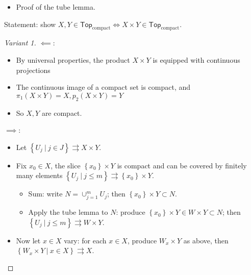 \begin{solution}

\envlist

\begin{concept}

\envlist

\begin{itemize}
\tightlist
\item
  Proof of the tube lemma.
\end{itemize}

\end{concept}

Statement: show
\(X, Y \in {\mathsf{Top}}_{\mathrm{compact}} \iff X\times Y\in {\mathsf{Top}}_{\mathrm{compact}}\).

\begin{proof}[Variant 1]

\(\impliedby\):

\begin{itemize}
\tightlist
\item
  By universal properties, the product \(X\times Y\) is equipped with
  continuous projections
\item
  The continuous image of a compact set is compact, and
  \(\pi_1(X\times Y) = X, p_2(X\times Y) = Y\)
\item
  So \(X, Y\) are compact.
\end{itemize}

\(\implies\):

\begin{itemize}
\tightlist
\item
  Let
  \(\left\{{U_j {~\mathrel{\Big|}~}j\in J}\right\} \rightrightarrows X\times Y\).
\item
  Fix \(x_0\in X\), the slice \(\left\{{x_0}\right\} \times Y\) is
  compact and can be covered by finitely many elements
  \(\left\{{U_j{~\mathrel{\Big|}~}j\leq m}\right\} \rightrightarrows\left\{{x_0}\right\} \times Y\).

  \begin{itemize}
  \tightlist
  \item
    Sum: write \(N = \cup_{j=1}^m U_j\); then
    \(\left\{{x_0}\right\} \times Y \subset N\).
  \item
    Apply the tube lemma to \(N\): produce
    \(\left\{{x_0}\right\} \times Y \in W\times Y \subset N\); then
    \(\left\{{U_j {~\mathrel{\Big|}~}j\leq m}\right\}\rightrightarrows W\times Y\).
  \end{itemize}
\item
  Now let \(x\in X\) vary: for each \(x\in X\), produce \(W_x \times Y\)
  as above, then
  \(\left\{{W_x\times Y{~\mathrel{\Big|}~}x\in X}\right\}\rightrightarrows X\).


\end{itemize}
\end{proof}
\end{solution}
